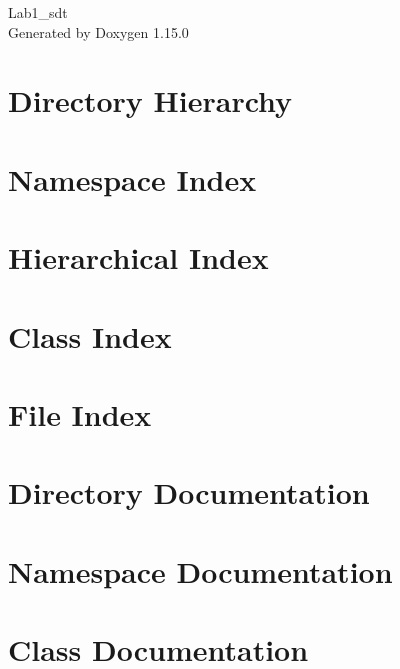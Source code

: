 \documentclass[twoside]{book}
\newcommand{\+}{\discretionary{\mbox{\scriptsize$\hookleftarrow$}}{}{}}
\newcommand{\clearemptydoublepage}{%
    \newpage{\pagestyle{empty}\cleardoublepage}%
  }
\begin{document}
  \raggedbottom
    \hypersetup{pageanchor=false,
                bookmarksnumbered=true,
                pdfencoding=unicode
               }
  \begin{titlepage}
  \vspace*{7cm}
  \begin{center}%
  {\Large Lab1\+\_\+sdt}\\
  \vspace*{1cm}
  {\large Generated by Doxygen 1.15.0}\\
  \end{center}
  \end{titlepage}
  \clearemptydoublepage
  \tableofcontents
  \clearemptydoublepage
  \hypersetup{pageanchor=true}


\chapter{Directory Hierarchy}

\chapter{Namespace Index}

\chapter{Hierarchical Index}

\chapter{Class Index}

\chapter{File Index}

\chapter{Directory Documentation}

\chapter{Namespace Documentation}


\chapter{Class Documentation}








\end{document}
